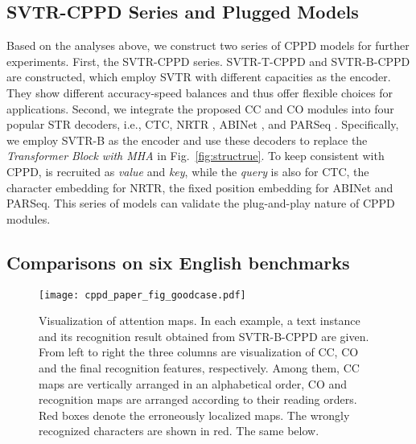 \documentclass[10pt,journal,compsoc]{IEEEtran}
\begin{document}
\subsection{SVTR-CPPD Series and Plugged Models}
Based on the analyses above, we construct two series of CPPD models for further experiments. First, the SVTR-CPPD series. SVTR-T-CPPD and SVTR-B-CPPD are constructed, which employ SVTR with different capacities as the encoder. They show different accuracy-speed balances and thus offer flexible choices for applications. Second, we integrate the proposed CC and CO modules into four popular STR decoders, i.e., CTC, NRTR \cite{Sheng2019nrtr}, ABINet \cite{fang2021abinet}, and PARSeq \cite{BautistaA22PARSeq}. Specifically, we employ SVTR-B as the encoder and use these decoders to replace the \emph{Transformer Block with MHA} in Fig.~\ref{fig:structrue}. To keep consistent with CPPD,  is recruited as \emph{value} and \emph{key}, while the \emph{query} is also  for CTC, the character embedding for NRTR, the fixed position embedding for ABINet and PARSeq. This series of models can validate the plug-and-play nature of CPPD modules.


\subsection{Comparisons on six English benchmarks}

\begin{figure*}[t]  
\centering  
\texttt{[image: cppd\_paper\_fig\_goodcase.pdf]}  
\caption{Visualization of attention maps. In each example, a text instance and its recognition result obtained from SVTR-B-CPPD are given. From left to right the three columns are visualization of CC, CO and the final recognition features, respectively. Among them, CC maps are vertically arranged in an alphabetical order, CO and recognition maps are arranged according to their reading orders. Red boxes denote the erroneously localized maps. The wrongly recognized characters are shown in red. The same below.}  
\label{fig:vis_2}  
\end{figure*}
\end{document}
